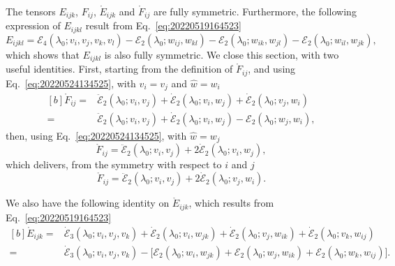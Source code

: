 \documentclass[12pt, final]{scrartcl}
\theoremstyle{definition}
\newcommand{\E}{\mathcal E}
\begin{document}
The tensors $E_{ijk}$, $F_{ij}$, $\mathring{E}_{ijk}$ and $\mathring{F}_{ij}$ are fully symmetric. Furthermore, the
following expression of $E_{ijkl}$ result from Eq.~\eqref{eq:20220519164523}
\begin{equation}
  \label{eq:20220802081116}
  E_{ijkl} = \E_4(\lambda_0 ; v_i, v_j, v_k, v_l) - \E_2(\lambda_0 ; w_{ij}, w_{kl}) - \E_2(\lambda_0 ; w_{ik}, w_{jl}) - \E_2(\lambda_0 ; w_{il}, w_{jk}),
\end{equation}
which shows that $E_{ijkl}$ is also fully symmetric. We close this section, with two useful identities. First, starting
from the definition of $\mathring{F}_{ij}$, and using Eq.~\eqref{eq:20220524134525}, with $v_i = v_j$ and
$\hat{w} = w_i$
\begin{equation}
  \label{eq:20220617084433}
  \begin{aligned}[b]
    \mathring{F}_{ij} ={} & \ddot{\E}_2(\lambda_0; v_i, v_j) + \dot{\E}_2(\lambda_0; v_i, w_j) + \dot{\E}_2(\lambda_0; v_j, w_i)\\
    ={} & \ddot{\E}_2(\lambda_0; v_i, v_j) + \dot{\E}_2(\lambda_0; v_i, w_j) - \E_2(\lambda_0; w_j, w_i),
  \end{aligned}
\end{equation}
then, using Eq.~\eqref{eq:20220524134525}, with $\hat{w} = w_j$
\begin{equation}
  \mathring{F}_{ij} = \ddot{\E}_2(\lambda_0; v_i, v_j)  + 2\dot{\E}_2(\lambda_0; v_i, w_j),
\end{equation}
which delivers, from the symmetry with respect to $i$ and $j$
\begin{equation}
  \mathring{F}_{ij} = \ddot{\E}_2(\lambda_0; v_i, v_j) + 2\dot{\E}_2(\lambda_0; v_j, w_i).
\end{equation}

We also have the following identity on $\mathring{E}_{ijk}$, which results from Eq.~\eqref{eq:20220519164523}
\begin{equation}
  \label{eq:20220617085256}
  \begin{aligned}[b]
  \mathring{E}_{ijk} ={}& \dot{\E}_3(\lambda_0; v_i, v_j, v_k) + \dot{\E}_2(\lambda_0; v_i, w_{jk}) + \dot{\E}_2(\lambda_0; v_j, w_{ik}) + \dot{\E}_2(\lambda_0; v_k, w_{ij})\\
  ={}& \dot{\E}_3(\lambda_0; v_i, v_j, v_k) - \bigl[\E_2(\lambda_0; w_i, w_{jk}) + \E_2(\lambda_0; w_j, w_{ik}) + \E_2(\lambda_0; w_k, w_{ij})\bigr].
  \end{aligned}
\end{equation}
\end{document}

